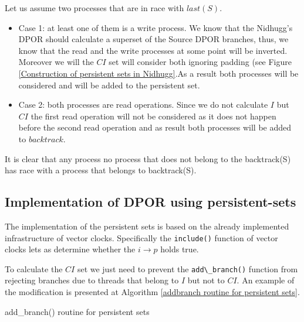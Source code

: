 Let us assume two processes that are in race with $last(S)$.
\begin{itemize}

\item Case 1: at least one of them is a write process.
We know that the Nidhugg's DPOR should calculate a superset of the Source DPOR branches, thus, we know that the read and the write processes at some point
will be inverted. Moreover we will the $CI$ set will consider both ignoring padding (see Figure \ref{Construction of persistent sets in Nidhugg}.As a result both processes will be considered and will be added to the persistent set.


\item Case 2: both processes are read operations.
Since we do not calculate $I$ but $CI$ the first read operation will not be considered as it does not happen before the second read operation and as result
both processes will be added to $backtrack$. 

\end{itemize}
It is clear that any process no process that does not belong to the backtrack(S) has race with a process that belongs to backtrack(S).

\subsection{Implementation of DPOR using persistent-sets}

The implementation of the persistent sets is based on the already implemented infrastructure of vector clocks. Specifically the \verb|include()| function of vector clocks
lets as determine whether the $i \rightarrow p$ holds true.

To calculate the $CI$ set we just need to prevent the \verb|add\_branch()| function from rejecting branches due to threads that belong to $I$ but not to $CI$.
An example of the modification is presented at Algorithm \ref{addbranch routine for persistent sets}.

\begin{algorithm}
    \caption{add\_branch() routine for persistent sets}
    \label{addbranch routine for persistent sets}
\end{algorithm}

